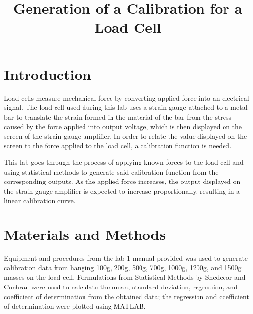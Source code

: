 \documentclass[conference, letterpaper]{IEEEtran}
\begin{document}
\title{Generation of a Calibration for a Load Cell}

\author{}

\maketitle

\section{Introduction}
    Load cells measure mechanical force by converting applied force into an electrical signal. The load cell used during this lab uses a strain gauge attached to a metal bar to translate the strain formed in the material of the bar from the stress caused by the force applied into output voltage, which is then displayed on the screen of the strain gauge amplifier. In order to relate the value displayed on the screen to the force applied to the load cell, a calibration function is needed. \par
    \smallskip
    This lab goes through the process of applying known forces to the load cell and using statistical methods to generate said calibration function from the corresponding outputs. As the applied force increases, the output displayed on the strain gauge amplifier is expected to increase proportionally, resulting in a linear calibration curve.

\section{Materials and Methods}
    Equipment and procedures from the lab 1 manual\cite{1OLM2023} provided was used to generate calibration data from hanging 100g, 200g, 500g, 700g, 1000g, 1200g, and 1500g masses on the load cell. 
    Formulations from Statistical Methods by Snedecor and Cochran\cite{SNEDECOR1989} were used to calculate the mean, standard deviation, regression, and coefficient of determination from the obtained data; the regression and coefficient of determination were plotted using MATLAB.\@
\end{document}
